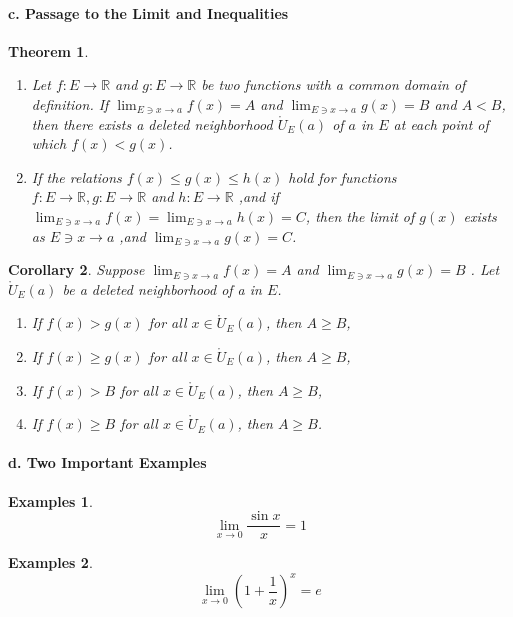 \documentclass[a4paper,12pt]{article} %
\newtheorem{theorem}{Theorem}[section]
\newtheorem{corollary}[theorem]{Corollary}
\newtheorem{example}{Examples}
\begin{document}
\paragraph{{\rm \textbf{c. Passage to the Limit and Inequalities}}}
\begin{theorem}
    \begin{enumerate}
    \item
    Let $\displaystyle f: E \to \mathbb{R}$ and $g: E \to \mathbb{R}$
    be two functions with a common domain of definition.
    If $\displaystyle \lim_{E \ni x \to a}f(x) = A$  and 
       $\displaystyle \lim_{E \ni x \to a}g(x) = B$ and $A < B$,
    then there exists a deleted neighborhood $\displaystyle 
    \mathring{U}_E(a)$ of $a$ in $E$ at each point of which $f(x) < g(x)$.
    \item 
    If the relations $f(x) \le g(x) \le h(x)$ hold for functions 
    $f: E \to \mathbb{R}, g: E \to \mathbb{R}$ and $h: E \to \mathbb{R}$
    ,and if $\displaystyle \lim_{E \ni x \to a}f(x) = \lim_{E \ni x \to a}h(x) = C$,
    then the limit of $g(x)$ exists as $\displaystyle E \ni x \to a$ ,and 
            $\displaystyle \lim_{E \ni x \to a}g(x) = C$.
    \end{enumerate}
\end{theorem}

\begin{corollary}
    Suppose $\displaystyle \lim_{E \ni x \to a}f(x) = A$  and 
       $\displaystyle \lim_{E \ni x \to a}g(x) = B$ .
       Let $\displaystyle \mathring{U}_E(a)$ be a deleted neighborhood of 
       a in $E$.
       \begin{enumerate}
           \item If $f(x) > g(x)$ for all $\displaystyle x \in \mathring{U}_E(a)$,
            then $A \ge B$,
           \item If $f(x) \ge g(x)$ for all $\displaystyle x \in \mathring{U}_E(a)$,
            then $A \ge B$,
           \item If $f(x) > B$ for all $\displaystyle x \in \mathring{U}_E(a)$,
            then $A \ge B$,
           \item If $f(x) \ge B$ for all $\displaystyle x \in \mathring{U}_E(a)$,
            then $A \ge B$.
       \end{enumerate}
\end{corollary}

\paragraph{{\rm \textbf{d. Two Important Examples}}}
\begin{example}
    \[
        \lim_{x \to 0}\frac{\sin x}{x} = 1
        \]
\end{example}
\begin{example}
    \[
        \lim_{x \to 0}\left(1+\frac{1}{x}\right)^x = e
        \]
\end{example}
\end{document}
